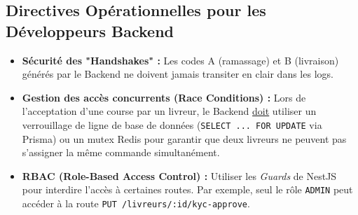         




\subsection{Directives Opérationnelles pour les Développeurs Backend}
\begin{itemize}
    \item \textbf{Sécurité des "Handshakes" :} Les codes A (ramassage) et B (livraison) générés par le Backend ne doivent jamais transiter en clair dans les logs.
    \item \textbf{Gestion des accès concurrents (Race Conditions) :} Lors de l'acceptation d'une course par un livreur, le Backend \underline{doit} utiliser un verrouillage de ligne de base de données (\texttt{SELECT ... FOR UPDATE} via Prisma) ou un mutex Redis pour garantir que deux livreurs ne peuvent pas s'assigner la même commande simultanément.
    \item \textbf{RBAC (Role-Based Access Control) :} Utiliser les \textit{Guards} de NestJS pour interdire l'accès à certaines routes. Par exemple, seul le rôle \texttt{ADMIN} peut accéder à la route \texttt{PUT /livreurs/:id/kyc-approve}.
\end{itemize}